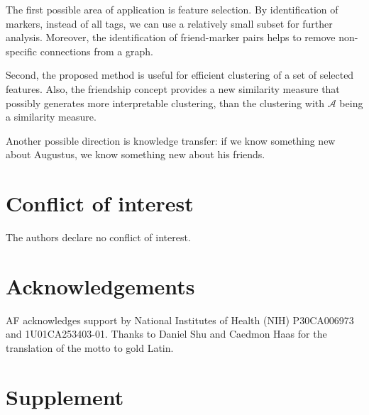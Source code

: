 \documentclass{llncs}
\begin{document}
The first possible area of application is feature selection. By identification of markers, instead of all tags, we can use a relatively small subset for further analysis. Moreover, the identification of friend-marker pairs helps to remove non-specific connections from a graph. 

Second, the proposed method is useful for efficient clustering of a set of selected features. Also, the friendship concept provides a new similarity measure that possibly generates more interpretable clustering, than the clustering with $\mathcal{A}$ being a similarity measure.

Another possible direction is knowledge transfer: if we know something new about Augustus, we know something new about his friends. 
\subsection{}




\section{Conflict of interest}
The authors declare no conflict of interest.

\section{Acknowledgements}
AF acknowledges support by National Institutes of Health (NIH) P30CA006973 and 1U01CA253403-01.
Thanks to Daniel Shu and Caedmon Haas for the translation of the motto to gold Latin. 





\newcommand{\beginsupplement}{%
 \setcounter{table}{0}
 \renewcommand{\thetable}{S\arabic{table}}%
 \setcounter{figure}{0}
 \renewcommand{\thefigure}{S\arabic{figure}}
 \setcounter{equation}{0}
 \renewcommand{\theequation}{S\arabic{equation}}%
 }

\newpage
\section*{Supplement}
\beginsupplement
\end{document}
